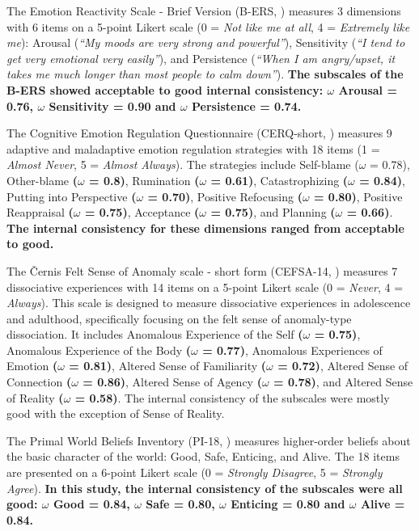 \documentclass[
  man,
  floatsintext,
  longtable,
  nolmodern,
  notxfonts,
  notimes,
  mask,
  colorlinks=true,linkcolor=blue,citecolor=blue,urlcolor=blue]{apa7}
\begin{document}
The Emotion Reactivity Scale - Brief Version (B-ERS,
) measures
3 dimensions with 6 items on a 5-point Likert scale (0 = \emph{Not like
me at all}, 4 = \emph{Extremely like me}): Arousal (\emph{``My moods are
very strong and powerful''}), Sensitivity (\emph{``I tend to get very
emotional very easily''}), and Persistence (\emph{``When I am
angry/upset, it takes me much longer than most people to calm down''}).
\textbf{The subscales of the B-ERS showed acceptable to good internal
consistency: \(\omega\) Arousal = 0.76, \(\omega\) Sensitivity = 0.90
and \(\omega\) Persistence = 0.74.}

The Cognitive Emotion Regulation Questionnaire (CERQ-short,
)
measures 9 adaptive and maladaptive emotion regulation strategies with
18 items (1 = \emph{Almost Never}, 5 = \emph{Almost Always}). The
strategies include Self-blame (\(\omega\) = 0.78), Other-blame
\textbf{(\(\omega\) = 0.8)}, Rumination \textbf{(\(\omega\) = 0.61)},
Catastrophizing \textbf{(\(\omega\) = 0.84)}, Putting into Perspective
\textbf{(\(\omega\) = 0.70)}, Positive Refocusing \textbf{(\(\omega\) =
0.80)}, Positive Reappraisal \textbf{(\(\omega\) = 0.75)}, Acceptance
\textbf{(\(\omega\) = 0.75)}, and Planning \textbf{(\(\omega\) = 0.66)}.
\textbf{The internal consistency for these dimensions ranged from
acceptable to good.}

The Černis Felt Sense of Anomaly scale - short form (CEFSA-14,
) measures 7
dissociative experiences with 14 items on a 5-point Likert scale (0 =
\emph{Never}, 4 = \emph{Always}). This scale is designed to measure
dissociative experiences in adolescence and adulthood, specifically
focusing on the felt sense of anomaly-type dissociation. It includes
Anomalous Experience of the Self \textbf{(\(\omega\) = 0.75)}, Anomalous
Experience of the Body \textbf{(\(\omega\) = 0.77)}, Anomalous
Experiences of Emotion \textbf{(\(\omega\) = 0.81)}, Altered Sense of
Familiarity \textbf{(\(\omega\) = 0.72)}, Altered Sense of Connection
\textbf{(\(\omega\) = 0.86)}, Altered Sense of Agency
\textbf{(\(\omega\) = 0.78)}, and Altered Sense of Reality
\textbf{(\(\omega\) = 0.58)}. The internal consistency of the subscales
were mostly good with the exception of Sense of Reality.

The Primal World Beliefs Inventory (PI-18,
) measures
higher-order beliefs about the basic character of the world: Good, Safe,
Enticing, and Alive. The 18 items are presented on a 6-point Likert
scale (0 = \emph{Strongly Disagree}, 5 = \emph{Strongly Agree}).
\textbf{In this study, the internal consistency of the subscales were
all good: \(\omega\) Good = 0.84, \(\omega\) Safe = 0.80, \(\omega\)
Enticing = 0.80 and \(\omega\) Alive = 0.84.}
\end{document}
